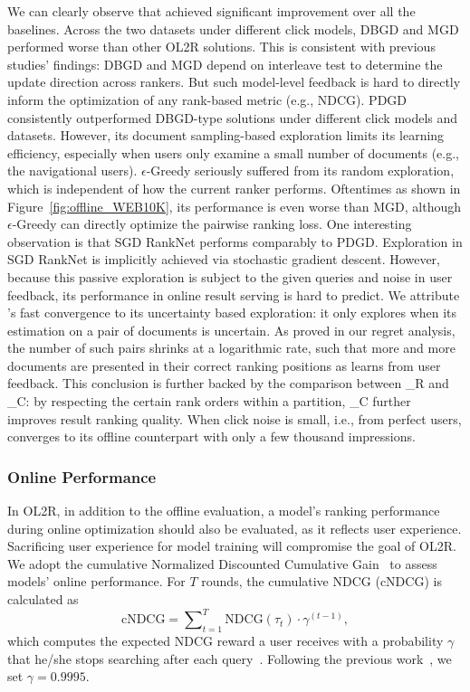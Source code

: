 We can clearly observe that \model{} achieved significant improvement over all the baselines. Across the two datasets under different click models, DBGD and MGD performed worse than other OL2R solutions. This is consistent with previous studies' findings: DBGD and MGD depend on interleave test to determine the update direction across rankers. But such model-level feedback is hard to directly inform the optimization of any rank-based metric (e.g., NDCG). PDGD consistently outperformed DBGD-type solutions under different click models and datasets. However, its document sampling-based exploration limits its learning efficiency, especially when users only examine a small number of documents (e.g., the navigational users).
$\epsilon$-Greedy seriously suffered from its random exploration, which is independent of how the current ranker performs. Oftentimes as shown in Figure~\ref{fig:offline_WEB10K}, its performance is even worse than MGD, although $\epsilon$-Greedy can directly optimize the pairwise ranking loss.  
One interesting observation is that SGD RankNet performs comparably to PDGD. Exploration in SGD RankNet is implicitly achieved via stochastic gradient descent. However, because this passive exploration is subject to the given queries and noise in user feedback, its performance in online result serving is hard to predict. 
We attribute \model{}'s fast convergence to its uncertainty based exploration: it only explores when its estimation on a pair of documents is uncertain. As proved in our regret analysis, the number of such pairs shrinks at a logarithmic rate, such that more and more documents are presented in their correct ranking positions as \model{} learns from user feedback. This conclusion is further backed by the comparison between \model{}\_R and \model{}\_C: by respecting the certain rank orders within a partition, \model{}\_C further improves result ranking quality. When click noise is small, i.e., from perfect users, \model{} converges to its offline counterpart with only a few thousand impressions. 


\subsubsection{Online Performance}



In OL2R, in addition to the offline evaluation, a model's ranking performance during online optimization should also be evaluated, as it reflects user experience. Sacrificing user experience for model training will compromise the goal of OL2R. We adopt the cumulative Normalized Discounted Cumulative Gain~\cite{oosterhuis2018differentiable} to assess models' online performance. For $T$ rounds, the cumulative NDCG (cNDCG) is calculated as
\small
\begin{equation*}
    \text{cNDCG} = \sum\nolimits_{t=1}^T \text{NDCG}(\tau_t) \cdot \gamma^{(t-1)},
\end{equation*}
\normalsize
which computes the expected NDCG reward a user receives with a probability $\gamma$ that he/she stops searching after each query~\cite{oosterhuis2018differentiable}. Following the previous work~\cite{oosterhuis2018differentiable, wang2019variance, wang2018efficient}, we set $\gamma = 0.9995$.

